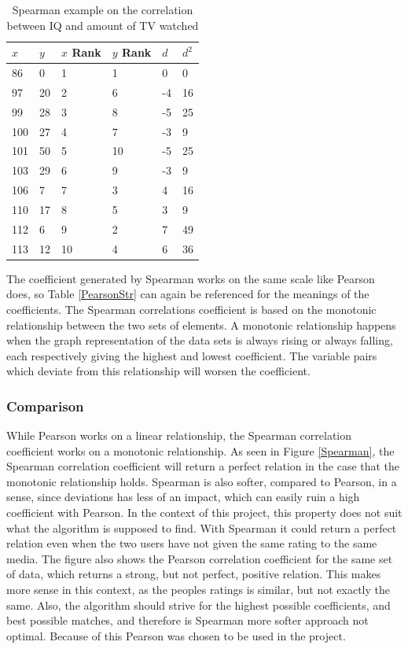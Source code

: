 \begin{table}[htb]
\centering
\begin{tabular}{|l|l|l|l|l|l|} \hline
	\textbf{$x$} & \textbf{$y$} & \textbf{$x$ Rank} & \textbf{$y$ Rank} & \textbf{$d$} & \textbf{$d^2$} \\ \hline
	86 & 0 & 1 & 1 & 0 & 0 \\ \hline
	97 & 20 & 2 & 6 & -4 & 16 \\ \hline
	99 & 28 & 3 & 8 & -5 & 25 \\ \hline
	100 & 27 & 4 & 7 & -3 & 9 \\ \hline
	101 & 50 & 5 & 10 & -5 & 25 \\ \hline
	103 & 29 & 6 & 9 & -3 & 9 \\ \hline
	106 & 7 & 7 & 3 & 4 & 16 \\ \hline
	110 & 17 & 8 & 5 & 3 & 9 \\ \hline
	112 & 6 & 9 & 2 & 7 & 49 \\ \hline
	113 & 12 & 10 & 4 & 6 & 36 \\ \hline
\end{tabular}
\caption{Spearman example on the correlation between IQ and amount of TV watched \cite{Spearman2}}
\label{SpearmanEx}
\end{table}

The coefficient generated by Spearman works on the same scale like Pearson does, so Table \ref{PearsonStr} can again be referenced for the meanings of the coefficients. The Spearman correlations coefficient is based on the monotonic relationship between the two sets of elements\cite{Spearman2}. A monotonic relationship happens when the graph representation of the data sets is always rising or always falling, each respectively giving the highest and lowest coefficient. The variable pairs which deviate from this relationship will worsen the coefficient.

\subsubsection{Comparison}

While Pearson works on a linear relationship, the Spearman correlation coefficient works on a monotonic relationship. As seen in Figure \ref{Spearman}, the Spearman correlation coefficient will return a perfect relation in the case that the monotonic relationship holds. Spearman is also softer, compared to Pearson, in a sense, since deviations has less of an impact, which can easily ruin a high coefficient with Pearson. In the context of this project, this property does not suit what the algorithm is supposed to find. With Spearman it could return a perfect relation even when the two users have not given the same rating to the same media. The figure also shows the Pearson correlation coefficient for the same set of data, which returns a strong, but not perfect, positive relation. This makes more sense in this context, as the peoples ratings is similar, but not exactly the same. Also, the algorithm should strive for the highest possible coefficients, and best possible matches, and therefore is Spearman more softer approach not optimal. Because of this Pearson was chosen to be used in the project.

